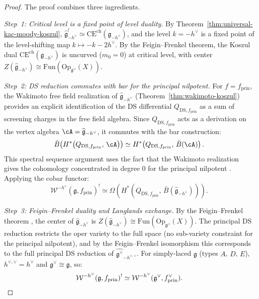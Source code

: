 \begin{proof}
The proof combines three ingredients.

\emph{Step~1: Critical level is a fixed point of level duality.}
By Theorem~\ref{thm:universal-kac-moody-koszul}, $\widehat{\mathfrak{g}}_{-h^\vee}^! \simeq \mathrm{CE}^{\mathrm{ch}}(\mathfrak{g}_{-h^\vee})$, and the level $k = -h^\vee$ is a fixed point of the level-shifting map $k \mapsto -k-2h^\vee$.  By the Feigin--Frenkel theorem, the Koszul dual $\mathrm{CE}^{\mathrm{ch}}(\mathfrak{g}_{-h^\vee})$ is uncurved ($m_0 = 0$) at critical level, with center $Z(\widehat{\mathfrak{g}}_{-h^\vee}) \cong \mathrm{Fun}(\mathrm{Op}_{\mathfrak{g}^\vee}(X))$.

\emph{Step~2: DS reduction commutes with bar for the principal nilpotent.}
For $f = f_{\mathrm{prin}}$, the Wakimoto free field realization of $\widehat{\mathfrak{g}}_{-h^\vee}$ (Theorem~\ref{thm:wakimoto-koszul}) provides an explicit identification of the DS differential $Q_{\mathrm{DS},f_{\mathrm{prin}}}$ as a sum of screening charges in the free field algebra.  Since $Q_{\mathrm{DS},f_{\mathrm{prin}}}$ acts as a derivation on the vertex algebra $\cA = \widehat{\mathfrak{g}}_{-h^\vee}$, it commutes with the bar construction:
\[
\bar{B}\!\left(H^*\!\left(Q_{\mathrm{DS},f_{\mathrm{prin}}},\, \cA\right)\right)
\simeq H^*\!\left(Q_{\mathrm{DS},f_{\mathrm{prin}}},\, \bar{B}(\cA)\right).
\]
This spectral sequence argument uses the fact that the Wakimoto realization gives the cohomology concentrated in degree $0$ for the principal nilpotent \cite[Thm.~3.1]{FF}.  Applying the cobar functor:
\[
\mathcal{W}^{-h^\vee}(\mathfrak{g}, f_{\mathrm{prin}})^!
\simeq \Omega\!\left(H^*\!\left(Q_{\mathrm{DS},f_{\mathrm{prin}}},\, \bar{B}(\widehat{\mathfrak{g}}_{-h^\vee})\right)\right).
\]

\emph{Step~3: Feigin--Frenkel duality and Langlands exchange.}
By the Feigin--Frenkel theorem \cite{Feigin-Frenkel}, the center of $\widehat{\mathfrak{g}}_{-h^\vee}$ is $Z(\widehat{\mathfrak{g}}_{-h^\vee}) \cong \mathrm{Fun}(\mathrm{Op}_{\mathfrak{g}^\vee}(X))$.  The principal DS reduction restricts the oper variety to the full space (no sub-variety constraint for the principal nilpotent), and by the Feigin--Frenkel isomorphism this corresponds to the full principal DS reduction of $\widehat{\mathfrak{g}^\vee}_{-h^{\vee,\vee}}$.  For simply-laced $\mathfrak{g}$ (types $A$, $D$, $E$), $h^{\vee,\vee} = h^\vee$ and $\mathfrak{g}^\vee \cong \mathfrak{g}$, so:
\[
\mathcal{W}^{-h^\vee}(\mathfrak{g}, f_{\mathrm{prin}})^! \simeq \mathcal{W}^{-h^\vee}(\mathfrak{g}^\vee, f^\vee_{\mathrm{prin}}). \qedhere
\]
\end{proof}

